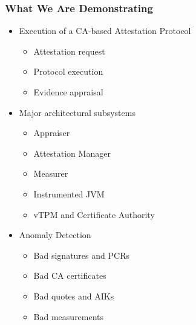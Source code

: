 \documentclass{beamer}
\begin{document}
\begin{frame}
  \frametitle{What We Are Demonstrating}
  
  \begin{itemize}
  \item Execution of a CA-based Attestation Protocol
    \begin{itemize}
    \item Attestation request
    \item Protocol execution
    \item Evidence appraisal
    \end{itemize}
  \item Major architectural subsystems
    \begin{itemize}
    \item Appraiser
    \item Attestation Manager
    \item Measurer
    \item Instrumented JVM
    \item vTPM and Certificate Authority
    \end{itemize}
  \item Anomaly Detection
    \begin{itemize}
    \item Bad signatures and PCRs
    \item Bad CA certificates
    \item Bad quotes and AIKs
    \item Bad measurements
    \end{itemize}
  \end{itemize}
\end{frame}



\end{document}
